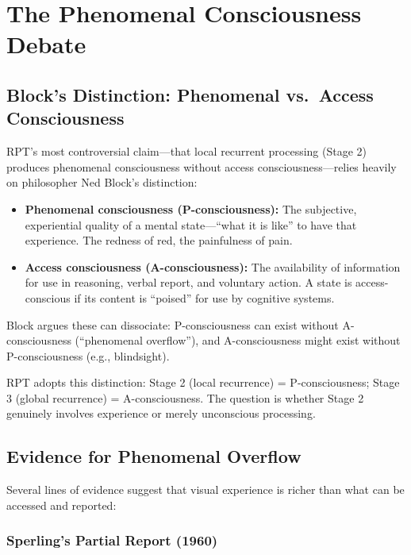 \documentclass[11pt,a4paper]{report}
\begin{document}
\chapter{The Phenomenal Consciousness Debate}

\section{Block's Distinction: Phenomenal vs.\ Access Consciousness}

RPT's most controversial claim---that local recurrent processing (Stage 2) produces phenomenal consciousness without access consciousness---relies heavily on philosopher Ned Block's distinction:

\begin{definitionbox}
\begin{itemize}[leftmargin=1.5em]
  \item \textbf{Phenomenal consciousness (P-consciousness):} The subjective, experiential quality of a mental state---``what it is like'' to have that experience. The redness of red, the painfulness of pain.
  \item \textbf{Access consciousness (A-consciousness):} The availability of information for use in reasoning, verbal report, and voluntary action. A state is access-conscious if its content is ``poised'' for use by cognitive systems.
\end{itemize}
Block argues these can dissociate: P-consciousness can exist without A-consciousness (``phenomenal overflow''), and A-consciousness might exist without P-consciousness (e.g., blindsight).
\end{definitionbox}

RPT adopts this distinction: Stage 2 (local recurrence) = P-consciousness; Stage 3 (global recurrence) = A-consciousness. The question is whether Stage 2 genuinely involves experience or merely unconscious processing.

\section{Evidence for Phenomenal Overflow}

Several lines of evidence suggest that visual experience is richer than what can be accessed and reported:

\subsection{Sperling's Partial Report (1960)}
\end{document}
